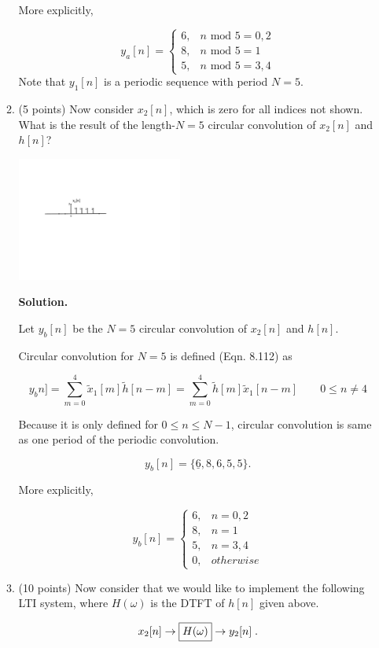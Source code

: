 \documentclass[]{siamltex}
\begin{document}
\begin{enumerate}
\begin{enumerate}
More explicitly, 

\[ y_a[n] = \begin{cases} 6,& n \text{ mod }5= 0,2 \\
8, & n  \text{ mod }5=1 \\
5, & n  \text{ mod }5 = 3,4  \end{cases}\]
Note that $y_1[n]$ is a periodic sequence with period $N=5$.


\item (5 points) Now consider $x_2[n]$, which is zero for all indices not shown. What is the result of the length-$N=5$ circular convolution of $x_2[n]$ and $h[n]$?

\includegraphics[width=0.45\textwidth]{x2}


\textbf{Solution.} 

Let $y_b[n]$ be the $N=5$ circular convolution of $x_2[n]$ and $h[n]$. 

Circular convolution for $N=5$ is defined (Eqn. 8.112) as 

\[ y_bn] = \sum_{m=0}^4 \tilde{x}_1[m] \tilde{h}[n-m] = \sum_{m=0}^4 \tilde{h}[m] \tilde{x}_1[n-m] \qquad 0 \leq n \neq 4\]

Because it is only defined for $0 \leq n \leq N-1$, circular convolution is same as one period of the periodic convolution.

\[ y_b[n] = \{\underline{6},8,6,5,5\}. \]

More explicitly,

\[ y_b[n] = \begin{cases} 6,& n= 0,2 \\
8, & n =1 \\
5, & n = 3,4 \\
0, & otherwise \end{cases} \]


\newpage
\item (10 points) Now consider that we would like to implement the following LTI system, where $H(\omega)$ is the DTFT of $h[n]$ given above.

$$x_2[n]  \rightarrow \fbox{$H(\omega)$} \rightarrow y_2[n]\;.$$


\end{enumerate}
\end{enumerate}
\end{document}
